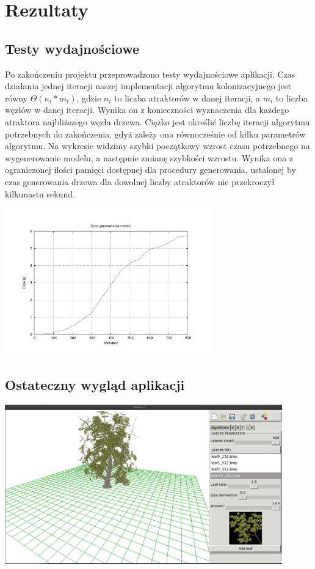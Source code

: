 
\chapter{Rezultaty}


\section{Testy wydajnościowe}
Po zakończeniu projektu przeprowadzono testy wydajnościowe aplikacji. Czas działania jednej iteracji naszej implementacji algorytmu kolonizacyjnego jest równy ${\Theta(n_i*m_i)}$, gdzie ${n_i}$ to liczba atraktorów
w danej iteracji, a ${m_i}$ to liczba węzłów w danej iteracji. Wynika on z konieczności wyznaczenia dla każdego atraktora najbliższego węzła drzewa.
Ciężko jest określić liczbę iteracji algorytmu potrzebnych do zakończenia, gdyż zależy ona równocześnie od kilku parametrów algorytmu.
 Na wykresie widzimy
szybki początkowy wzrost czasu potrzebnego na wygenerowanie modelu, a następnie zmianę szybkości wzrostu. Wynika ona z ograniczonej ilości
pamięci dostępnej dla procedury generowania, ustalonej by czas generowania drzewa dla dowolnej liczby atraktorów nie przekroczył kilkunastu sekund.



\begin{center}
	\includegraphics[width=90mm]{images/performance.pdf}
\end{center}

\section{Ostateczny wygląd aplikacji}
\begin{center}
	\includegraphics[width=120mm]{images/gui/all.png}
\end{center}

